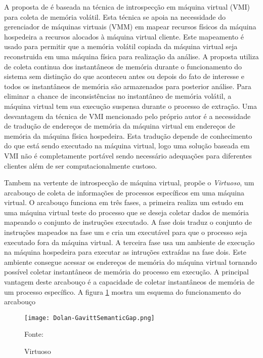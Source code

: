 A proposta de \cite{PoiselVMI:2013} é baseada na técnica de introspecção em máquina virtual (VMI) para coleta de memória volátil. 
%
Esta técnica se apoia na necessidade do gerenciador de máquinas virtuais (VMM) em mapear recursos físicos da máquina hospedeira a recursos alocados à máquina virtual cliente.
%
Este mapeamento é usado para permitir que a memória volátil copiada da máquina virtual seja reconstruida em uma máquina física para realização da análise.
%
A proposta utiliza de coleta continua dos instantâneos de memória durante o funcionamento do sistema sem distinção do que aconteceu antes ou depois do fato de interesse e todos os instantâneos de memória são armazenados para posterior análise.
%
Para eliminar a chance de inconsistências no instantâneo de memória volátil, a máquina virtual tem sua execução suspensa durante o processo de extração.
%
Uma desvantagem da técnica de VMI mencionado pelo próprio autor é a necessidade de tradução de endereços de memória da máquina virtual em endereços de memória da máquina física hospedeira.
%
Esta tradução depende de conhecimento do que está sendo executado na máquina virtual, logo uma solução baseada em VMI não é completamente portável sendo necessário adequações para diferentes clientes além de ser computacionalmente custoso.
%

Tambem na vertente de introspecção de máquina virtual, \cite{Dolan-GavittSemanticGap:2011} propõe o \textit{Virtuoso}, um arcabouço de coleta de informações de processos específicos em uma máquina virtual.
%
O arcabouço funciona em três fases, a primeira realiza um estudo em uma máquina virtual teste do processo que se deseja coletar dados de memória mapeando o conjunto de instruções executado. 
%
A fase dois traduz o conjunto de instruções mapeados na fase um e cria um executável para que o processo seja executado fora da máquina virtual.
%
A terceira fase usa um ambiente de execução na máquina hospedeira para executar as intruções extraídas na fase dois. Este ambiente consegue acessar os endereços de memória do máquina virtual tornando possível coletar instantâneos de memória do processo em execução.
%
A principal vantagem deste arcabouço é a capacidade de coletar instantâneos de memória de um processo específico.
%
A figura \ref{fig:Dolan-GavittSemanticGap} mostra um esquema do funcionamento do arcabouço

\begin{figure}[htb!]
\footnotesize
\caption{Virtuoso}
\texttt{[image: Dolan-GavittSemanticGap.png]}
\centering
\label{fig:Dolan-GavittSemanticGap}
\begin{center}
Fonte: \cite{Dolan-GavittSemanticGap:2011} 
\end{center}
\end{figure}


